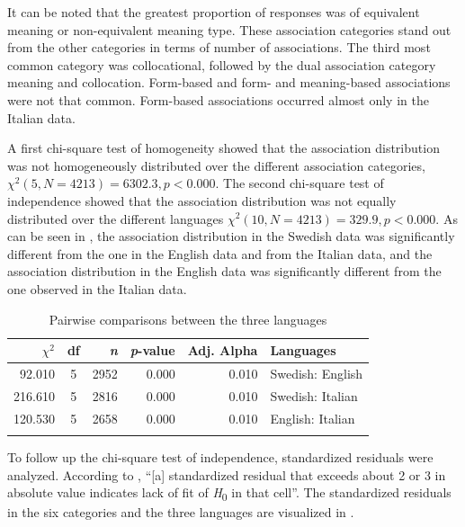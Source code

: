 \documentclass[output=paper,colorlinks,citecolor=brown,nonflat]{langsci/langscibook}
\begin{document}
It can be noted that the greatest proportion of responses was of equivalent meaning or non-equivalent meaning type. These association categories stand out from the other categories in terms of number of associations. The third most common category was collocational, followed by the dual association category meaning and collocation. Form-based and form- and meaning-based associations were not that common. Form-based associations occurred almost only in the Italian data.

A first chi-square test of homogeneity showed that the association distribution was not homogeneously distributed over the different association categories, $\chi^2 (5, N = 4213) = 6302.3, p <0.000$. The second chi-square test of independence showed that the association distribution was not equally distributed over the different languages  $\chi^2(10, N = 4213) = 329.9, p <0.000$. As can be seen in , the association distribution in the Swedish data was significantly different from the one in the English data and from the Italian data, and the association distribution in the English data was significantly different from the one observed in the Italian data.

\begin{table}[p]
    \begin{tabular}{rcrrrl}
    \lsptoprule
         $\chi^2$ & df & \textit{n} & \textit{p}-value & Adj. Alpha & Languages\\
    \midrule
        92.010 & 5 & 2952 & 0.000 & 0.010 & Swedish: English\\
        216.610 & 5 & 2816 & 0.000 & 0.010 & Swedish: Italian\\
        120.530 & 5 & 2658 & 0.000 & 0.010 & English: Italian\\
    \lspbottomrule
    \end{tabular}
    \caption{Pairwise comparisons between the three languages}
    \label{tab:gudmundson:3}
\end{table}

To follow up the chi-square test of independence, standardized residuals were analyzed. According to \citet[81]{Agresti2013}, “[a] standardized residual that exceeds about 2 or 3 in absolute value indicates lack of fit of \textit{H}\textsubscript{0} in that cell”. The standardized residuals in the six categories and the three languages are visualized in .
\end{document}
